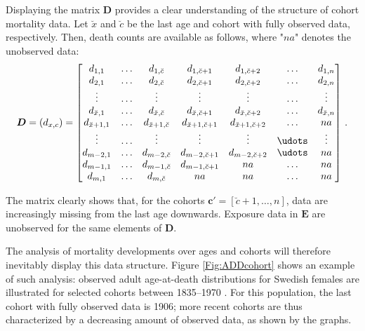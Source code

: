 \documentclass[11pt, a4paper]{article}
\newcommand{\tikzmark}[1]{\tikz[overlay,remember picture,baseline=(#1.base)]
	\node (#1) {\strut};}
\begin{document}
{Displaying the matrix $\bm{D}$ provides a clear understanding of the structure of cohort mortality data.  Let $\breve{x}$ and $\breve{c}$ be the last age and cohort with fully observed data, respectively. Then, death counts are available as follows, where "$na$" denotes the unobserved data:
%
\begin{equation}\label{Eq:Dmat}
\bm{D} = (d_{{x,c}}) = \begin{bmatrix} 
d_{1,1} & \dots & d_{1,\breve{c}} & d_{1,\breve{c}+1} & d_{1,\breve{c}+2} & \dots &  d_{1,n} \\
d_{2,1} & \dots & d_{2,\breve{c}} & d_{2,\breve{c}+1} & d_{2,\breve{c}+2} & \dots &  d_{2,n} \\
\vdots & \dots & \vdots & \vdots & \vdots & \dots &   \vdots \\
d_{\breve{x},1} & \dots & d_{\breve{x},\breve{c}} & d_{\breve{x},\breve{c}+1} & d_{\breve{x},\breve{c}+2} & \dots &  d_{\breve{x},n} \\
d_{\breve{x}+1,1} & \dots & d_{\breve{x}+1,\breve{c}} & d_{\breve{x}+1,\breve{c}+1} & d_{\breve{x}+1,\breve{c}+2} & \dots &  na \\
\vdots & \dots & \vdots & \vdots & \vdots & \udots &   \vdots \\
d_{m-2,1} & \dots & d_{m-2,\breve{c}} & d_{m-2,\breve{c}+1} & d_{m-2,\breve{c}+2} & \udots  & na \\
d_{m-1,1} & \dots & d_{m-1,\breve{c}} & d_{m-1,\breve{c}+1} &  na  & \dots & na \\
\tikzmark{lower1}d_{m,1} & \dots & d_{m,\breve{c}}\tikzmark{lower2} & \tikzmark{lowerA}na  & na  & \dots & na\tikzmark{lowerB}
\end{bmatrix} \, . \notag
\end{equation}
%


\medskip The matrix clearly shows that, for the cohorts $\bm{c}'=\left[\breve{c}+1,\dots,n\right]$, data are increasingly missing from the last age downwards. Exposure data in $\bm{E}$ are unobserved for the same elements of $\bm{D}$.  

The analysis of mortality developments over ages and cohorts will therefore inevitably display this data structure. Figure \ref{Fig:ADDcohort} shows an example of such analysis: observed adult age-at-death distributions for Swedish females are illustrated for selected cohorts between 1835--1970 \cite[data retrieved from the][]{HMD}. For this population, the last cohort with fully observed data is 1906; more recent cohorts are thus characterized by a decreasing amount of observed data, as shown by the graphs.

}
\end{document}
